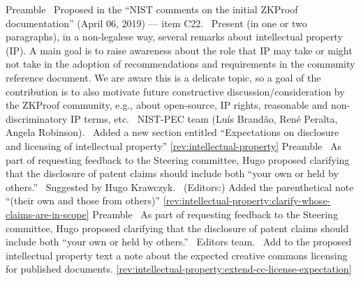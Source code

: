 Preamble
\newcol \ccontext\ Proposed in the ``NIST comments on the initial ZKProof documentation'' (April 06, 2019) --- item C22.
				\propContrib\ Present (in one or two paragraphs), in a non-legalese way, several remarks about intellectual property (IP). A main goal is to raise awareness about the role that IP may take or might not take in the adoption of recommendations and requirements in the community reference document. We are aware this is a delicate topic, so a goal of the contribution is to also motivate future constructive discussion/consideration by the ZKProof community, e.g., about open-source, IP rights, reasonable and non-discriminatory IP terms, etc.
\newcol {}
\newcol \contributors\ NIST-PEC team (Luís Brandão, René Peralta, Angela Robinson).
				\Chan\ Added a new section entitled ``Expectations on disclosure and licensing of intellectual property''
\newcol \ref{rev:intellectual-property}
\rowendL
Preamble
\newcol \propContrib\ As part of requesting feedback to the Steering committee, Hugo proposed 
clarifying that the disclosure of patent claims should include both ``your own or held by others.''
\newcol {}
\newcol \contributors\ Suggested by Hugo Krawczyk.
				\Chan\ (Editors:) Added the parenthetical note ``(their own and those from others)''
\newcol \ref{rev:intellectual-property:clarify-whose-claims-are-in-scope}
\rowendL
Preamble
\newcol \propContrib\ As part of requesting feedback to the Steering committee, Hugo proposed 
clarifying that the disclosure of patent claims should include both ``your own or held by others.''
\newcol {}
\newcol \contributors\ Editors team.
				\Chan\ Add to the proposed intellectual property text a note about the expected creative commons licensing for published documents.
\newcol \ref{rev:intellectual-property:extend-cc-license-expectation}
\rowendL
\myendIssue



